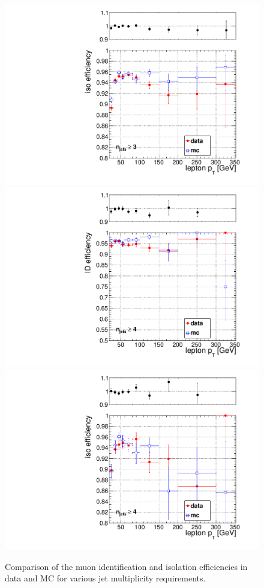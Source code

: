 \begin{figure}[hbt]
\begin{center}
	\includegraphics[width=0.3\linewidth]{plots/mu_iso_njets3.pdf}
	\includegraphics[width=0.3\linewidth]{plots/mu_id_njets4.pdf}%
	\includegraphics[width=0.3\linewidth]{plots/mu_iso_njets4.pdf}
	\caption{
	  \label{fig:mutnpeff} Comparison of the muon identification and isolation efficiencies in data and MC for various jet multiplicity requirements. }  
      \end{center}
\end{figure}

\clearpage

